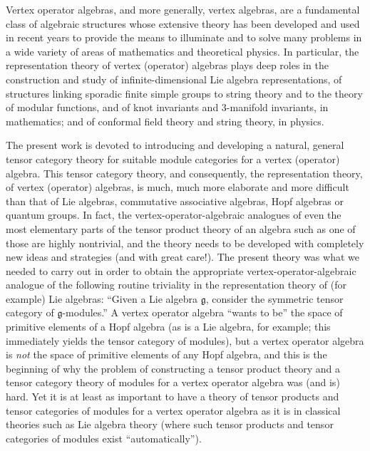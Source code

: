 \documentclass[12pt]{article}
\begin{document}
Vertex operator algebras, and more generally, vertex algebras, are a
fundamental class of algebraic structures whose extensive theory has
been developed and used in recent years to provide the means to
illuminate and to solve many problems in a wide variety of areas of
mathematics and theoretical physics.  In particular, the
representation theory of vertex (operator) algebras plays deep roles
in the construction and study of infinite-dimensional Lie algebra
representations, of structures linking sporadic finite simple groups
to string theory and to the theory of modular functions, and of knot
invariants and $3$-manifold invariants, in mathematics; and of
conformal field theory and string theory, in physics.

The present work is devoted to introducing and developing a natural,
general tensor category theory for suitable module categories for a
vertex (operator) algebra.  This tensor category theory, and
consequently, the representation theory, of vertex (operator)
algebras, is much, much more elaborate and more difficult than that of
Lie algebras, commutative associative algebras, Hopf algebras or
quantum groups.  In fact, the vertex-operator-algebraic analogues of
even the most elementary parts of the tensor product theory of an
algebra such as one of those are highly nontrivial, and the theory
needs to be developed with completely new ideas and strategies (and
with great care!).  The present theory was what we needed to carry out
in order to obtain the appropriate vertex-operator-algebraic analogue
of the following routine triviality in the representation theory of
(for example) Lie algebras: ``Given a Lie algebra $\mathfrak{g}$,
consider the symmetric tensor category of $\mathfrak{g}$-modules.''  A
vertex operator algebra ``wants to be'' the space of primitive
elements of a Hopf algebra (as is a Lie algebra, for example; this
immediately yields the tensor category of modules), but a vertex
operator algebra is {\it not} the space of primitive elements of any
Hopf algebra, and this is the beginning of why the problem of
constructing a tensor product theory and a tensor category theory of
modules for a vertex operator algebra was (and is) hard.  Yet it is at
least as important to have a theory of tensor products and tensor
categories of modules for a vertex operator algebra as it is in
classical theories such as Lie algebra theory (where such tensor
products and tensor categories of modules exist ``automatically'').
\end{document}
